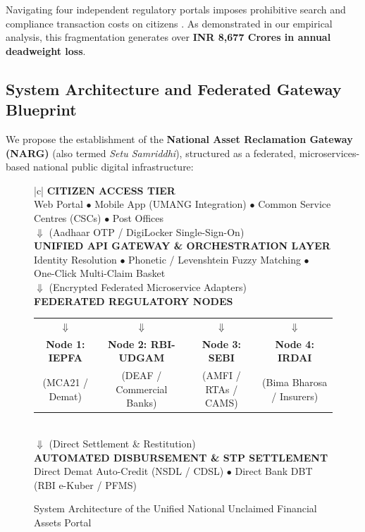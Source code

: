 \documentclass[openany]{book}
\begin{document}
Navigating four independent regulatory portals imposes prohibitive search and compliance transaction costs on citizens \cite{campbell2006household}. As demonstrated in our empirical analysis, this fragmentation generates over \textbf{INR 8,677 Crores in annual deadweight loss}. 

\subsection{System Architecture and Federated Gateway Blueprint}
We propose the establishment of the \textbf{National Asset Reclamation Gateway (NARG)} (also termed \textit{Setu Samriddhi}), structured as a federated, microservices-based national public digital infrastructure:

\begin{figure}[H]
\centering
\small
\begin{tabular}{|c|}
\hline
\textbf{CITIZEN ACCESS TIER} \\
Web Portal $\bullet$ Mobile App (UMANG Integration) $\bullet$ Common Service Centres (CSCs) $\bullet$ Post Offices \\
\hline
$\Downarrow$ (Aadhaar OTP / DigiLocker Single-Sign-On) \\
\hline
\textbf{UNIFIED API GATEWAY \& ORCHESTRATION LAYER} \\
Identity Resolution $\bullet$ Phonetic / Levenshtein Fuzzy Matching $\bullet$ One-Click Multi-Claim Basket \\
\hline
$\Downarrow$ (Encrypted Federated Microservice Adapters) \\
\hline
\textbf{FEDERATED REGULATORY NODES} \\
\begin{tabular}{cccc}
$\Downarrow$ & $\Downarrow$ & $\Downarrow$ & $\Downarrow$ \\
\textbf{Node 1: IEPFA} & \textbf{Node 2: RBI-UDGAM} & \textbf{Node 3: SEBI} & \textbf{Node 4: IRDAI} \\
(MCA21 / Demat) & (DEAF / Commercial Banks) & (AMFI / RTAs / CAMS) & (Bima Bharosa / Insurers) \\
\end{tabular} \\
\hline
$\Downarrow$ (Direct Settlement \& Restitution) \\
\hline
\textbf{AUTOMATED DISBURSEMENT \& STP SETTLEMENT} \\
Direct Demat Auto-Credit (NSDL / CDSL) $\bullet$ Direct Bank DBT (RBI e-Kuber / PFMS) \\
\hline
\end{tabular}
\caption{System Architecture of the Unified National Unclaimed Financial Assets Portal}
\label{fig:portal_architecture}
\end{figure}
\end{document}
